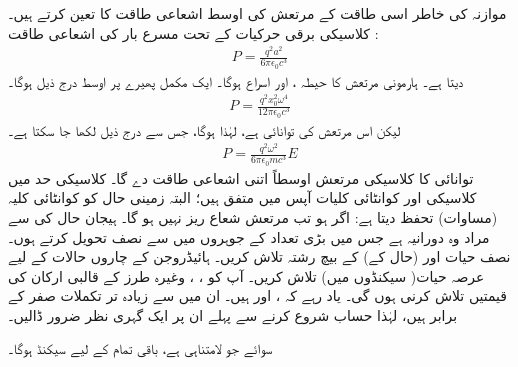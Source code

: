 موازنہ کی خاطر اسی طاقت کے   مرتعش کی  اوسط اشعاعی  طاقت کا  تعین کرتے ہیں۔ کلاسیکی برقی حرکیات کے تحت مسرع بار  کی  اشعاعی  طاقت  :
\begin{align}
	P = \frac{q^2a^2}{6\pi\epsilon_0c^3}
\end{align}
  دیتا ہے۔ ہارمونی مرتعش   کا حیطہ ،   اور  اسراع   ہوگا۔  ایک مکمل  پھیرے  پر   اوسط درج ذیل ہوگا۔
\begin{align*}
	P = \frac{q^2x^2_0\omega^4}{12\pi\epsilon_0c^3}
\end{align*}
لیکن اس مرتعش کی توانائی  ہے،  لہٰذا  ہوگا،  جس سے درج ذیل لکھا جا سکتا ہے۔
\begin{align}
	P = \frac{q^2\omega^2}{6\pi\epsilon_0mc^3}E
\end{align}
توانائی  کا کلاسیکی مرتعش اوسطاً اتنی اشعاعی  طاقت  دے گا۔ کلاسیکی حد  میں کلاسیکی اور کوانٹائی کلیات آپس میں متفق ہیں؛   البتہ زمینی حال کو کوانٹائی کلیہ
 (مساوات)   تحفظ  دیتا ہے: اگر  ہو تب مرتعش شعاع ریز نہیں ہو  گا۔
ہیجان حال کی    سے مراد وہ دورانیہ ہے جس میں بڑی تعداد کے جوہروں میں سے نصف تحویل کرتے ہوں۔ نصف حیات  اور  (حال کے)       کے بیچ رشتہ تلاش کریں۔
ہائیڈروجن کے چاروں  حالات کے لیے عرصہ حیات(  سیکنڈوں میں) تلاش کریں۔   آپ کو  ،    ،  وغیرہ   طرز کے قالبی ارکان کی قیمتیں تلاش کرنی ہوں گی۔ یاد رہے کہ
 ،    اور   ہیں۔ ان میں سے زیادہ تر تکملات صفر کے برابر  ہیں، لہٰذا حساب شروع کرنے سے پہلے ان پر ایک گہری نظر ضرور ڈالیں۔

  سوائے  جو لامتناہی ہے،  باقی تمام کے لیے  سیکنڈ  ہوگا۔



